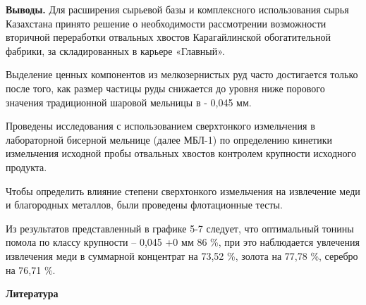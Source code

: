 {\bfseries Выводы.} Для расширения сырьевой базы и комплексного
использования сырья Казахстана принято решение о необходимости
рассмотрении возможности вторичной переработки отвальных хвостов
Карагайлинской обогатительной фабрики, за складированных в карьере
«Главный».

Выделение ценных компонентов из мелкозернистых руд часто достигается
только после того, как размер частицы руды снижается до уровня ниже
порового значения традиционной шаровой мельницы в - 0,045 мм.

Проведены исследования с использованием сверхтонкого измельчения в
лабораторной бисерной мельнице (далее МБЛ-1) по определению кинетики
измельчения исходной пробы отвальных хвостов контролем крупности
исходного продукта.

Чтобы определить влияние степени сверхтонкого измельчения на извлечение
меди и благородных металлов, были проведены флотационные тесты.

Из результатов представленный в графике 5-7 следует, что оптимальный
тонины помола по классу крупности -- 0,045 +0 мм 86 \%, при это
наблюдается увлечения извлечения меди в суммарной концентрат на 73,52
\%, золота на 77,78 \%, серебро на 76,71 \%.

{\bfseries Литература}

